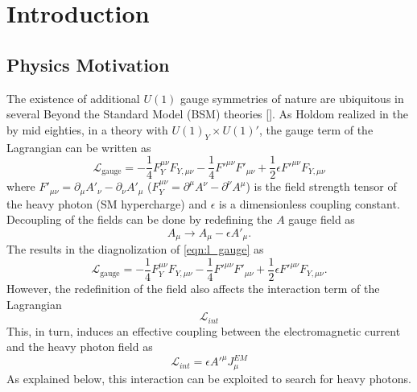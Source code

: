 \chapter{Introduction}

\section{Physics Motivation}

The existence of additional $U(1)$ gauge symmetries of nature are ubiquitous in
several Beyond the Standard Model (BSM) theories [].  As Holdom 
\cite{holdom1986} realized in the by mid eighties, in a theory with 
$U(1)_Y \times U(1)'$, the gauge term of the Lagrangian can be written as 
\begin{equation}
    \mathcal{L}_{\text{gauge}} = - \frac{1}{4} F_Y^{\mu \nu}F_{Y, \mu \nu}
                          - \frac{1}{4} F'^{\mu \nu}F'_{\mu \nu}
                          + \frac{1}{2} \epsilon F'^{\mu \nu} F_{Y, \mu \nu}
    \label{eqn:l_gauge}
\end{equation}
where $F'_{\mu \nu} = \partial_{\mu}A'_{\nu} - \partial_{\nu}A'_{\mu}$ 
($F^{\mu \nu}_{Y} = \partial^{\mu}A^{\nu} - \partial^{\nu}A^{\mu}$) is the
field strength tensor of the heavy photon (SM hypercharge) and $\epsilon$ is a
dimensionless coupling constant.  Decoupling of the fields can be done by 
redefining the $A$ gauge field as 
\begin{equation}
    A_{\mu} \rightarrow A_{\mu} - \epsilon A'_{\mu}.
\end{equation}
The results in the diagnolization of \ref{eqn:l_gauge} as
\begin{equation}
    \mathcal{L}_{\text{gauge}} = - \frac{1}{4} F_Y^{\mu \nu}F_{Y, \mu \nu}
                          - \frac{1}{4} F'^{\mu \nu}F'_{\mu \nu}
                          + \frac{1}{2} \epsilon F'^{\mu \nu} F_{Y, \mu \nu}.
\end{equation}
However, the redefinition of the field also affects the interaction term of 
the Lagrangian
\begin{equation}
    \mathcal{L}_{int} 
\end{equation}
This, in turn, induces an effective coupling between the electromagnetic current
and the heavy photon field as 
\begin{equation}
    \mathcal{L}_{int} = \epsilon A'^{\mu}J_{\mu}^{EM}
\end{equation}
As explained below, this interaction can be exploited to search for heavy 
photons.

